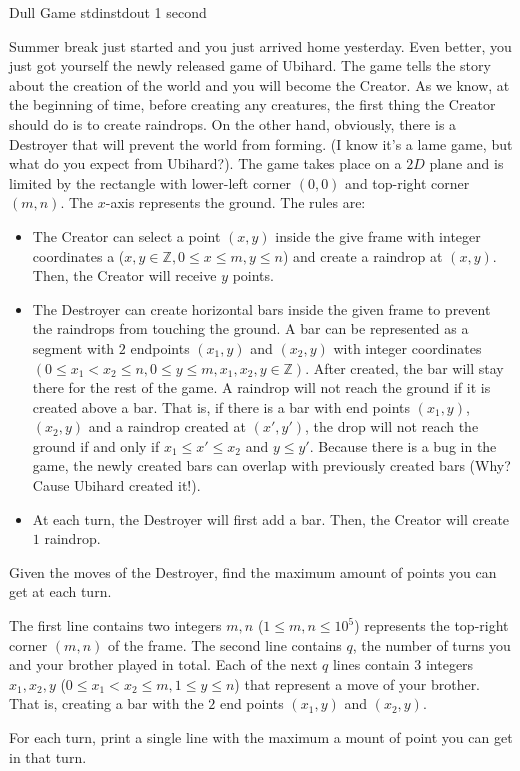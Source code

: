 \begin{problem}{Dull Game}
{stdin}{stdout}
{1 second}{}{}

Summer break just started and you just arrived home yesterday. Even better, you just got yourself the newly released game of Ubihard. The game tells the story about the creation of the world and you will become the Creator. As we know, at the beginning of time, before creating any creatures, the first thing the Creator should do is to create raindrops. On the other hand, obviously, there is a Destroyer that will prevent the world from forming. (I know it's a lame game, but what do you expect from Ubihard?). The game takes place on a $2D$ plane and is limited by the rectangle with lower-left corner $(0, 0)$ and top-right corner $(m, n)$. The $x$-axis represents the ground. The rules are:
	\begin{itemize}
		\item
		The Creator can select a point $(x, y)$ inside the give frame with integer coordinates a ($x, y \in \mathbb{Z}, 0 \leq x \leq m, y \leq n$) and create a raindrop at $(x, y)$. Then, the Creator will receive $y$ points.
		\item
		The Destroyer can create horizontal bars inside the given frame to prevent the raindrops from touching the ground. A bar can be represented as a segment with $2$ endpoints $(x_1, y)$ and $(x_2, y)$ with integer coordinates $(0 \leq x_1 < x_2 \leq n, 0 \leq y \leq m, x_1, x_2, y \in \mathbb{Z})$. After created, the bar will stay there for the rest of the game. A raindrop will not reach the ground if it is created above a bar. That is, if there is a bar with end points $(x_1, y)$, $(x_2, y)$ and a raindrop created at $(x', y')$, the drop will not reach the ground if and only if $x_1 \leq x' \leq x_2$ and $y \leq y'$. Because there is a bug in the game, the newly created bars can overlap with previously created bars (Why? Cause Ubihard created it!).
		\item
		At each turn, the Destroyer will first add a bar. Then, the Creator will create $1$ raindrop.
	\end{itemize}

\noindent Given the moves of the Destroyer, find the maximum amount of points you can get at each turn.

\InputFile

The first line contains two integers $m, n$ ($1 \leq m, n \leq 10^5$) represents the top-right corner $(m, n)$ of the frame. The second line contains $q$, the number of turns you and your brother played in total. Each of the next $q$ lines contain $3$ integers $x_1, x_2, y$ ($0 \leq x_1 < x_2 \leq m, 1 \leq y \leq n$) that represent a move of your brother. That is, creating a bar with the $2$ end points $(x_1, y)$ and $(x_2, y)$.

\OutputFile

For each turn, print a single line with the maximum a mount of point you can get in that turn.

\Examples

\begin{example}
%
\end{example}

\end{problem}

